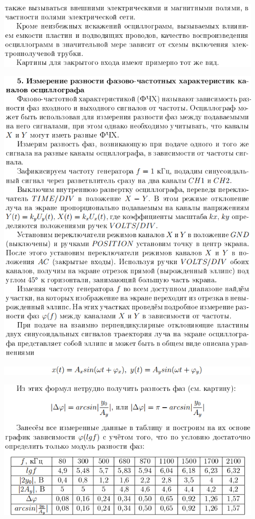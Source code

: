 \documentclass[a4paper,12pt]{article} %
\begin{document}
\begin{center}
\includegraphics{19}
\end{center}

\begin{center}
\includegraphics{20}
\end{center}

\begin{center}
\includegraphics{21}
\end{center}

\begin{center}
\includegraphics{22}
\end{center}
\end{document}

